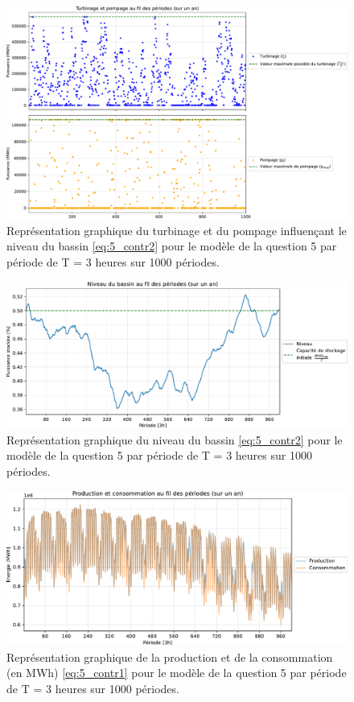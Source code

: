 \documentclass{article}
\begin{document}
\begin{figure}[H]
    \centering
    \includegraphics[scale=0.6]{GraphesP2/Turbinage_pompage_Q5.pdf}
    \caption{Représentation graphique du turbinage et du pompage
    influençant le niveau du bassin \eqref{eq:5_contr2} pour le modèle de la question 5 par période de T = 3 heures sur 1000 périodes.}
    \label{fig:Turbinage_pompage_Q5}
\end{figure}

\begin{figure}[H]
    \centering
    \includegraphics[scale=0.6]{GraphesP2/Niveau_Bassin_Q5.pdf}
    \caption{Représentation graphique du niveau du bassin \eqref{eq:5_contr2} pour le modèle 
    de la question 5 par période de T = 3 heures sur 1000 périodes.}
    \label{fig:Niveau_bassin_Q5}
\end{figure}

\begin{figure}[H]
    \centering
    \includegraphics[scale=0.6]{GraphesP2/Prod_Cons_Q5.pdf}
    \caption{Représentation graphique de la production et de la consommation (en MWh) 
    \eqref{eq:5_contr1} pour le modèle de la question 5 par période de T = 3 heures sur 1000 périodes.}
    \label{fig:Prod_Cons_Q5}
\end{figure}
\end{document}
